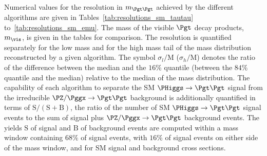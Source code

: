 Numerical values for the resolution in $m_{\Pgt\Pgt}$ achieved by the different algorithms are given in Tables~\ref{tab:resolutions_sm_tautau} to~\ref{tab:resolutions_sm_emu}.
The mass of the visible $\Pgt$ decay products, $m_{\vis}$, is given in the tables for comparison.
The resolution is quantified separately for the low mass and for the high mass tail of the mass distribution reconstructed by a given algorithm.
The symbol $\sigma_{l}/\textrm{M}$ ($\sigma_{h}/\textrm{M}$) denotes the 
ratio of the difference between the median and the $16\%$ quantile (between the $84\%$ quantile and the median) relative to the median
of the mass distribution.
The capability of each algorithm to separate the SM $\PHiggs \to \Pgt\Pgt$ signal from the irreducible $\PZ/\Pggx \to \Pgt\Pgt$ background 
is additionally quantified in terms of $\textrm{S}/(\textrm{S} + \textrm{B})$, the ratio of the number of SM $\PHiggs \to \Pgt\Pgt$ signal events to the sum of signal plus $\PZ/\Pggx \to \Pgt\Pgt$ background events.
The yields $\textrm{S}$ of signal and $\textrm{B}$ of background events are computed within a mass window containing $68\%$ of signal events,
with $16\%$ of signal events on either side of the mass window, and for SM signal and background cross sections.

